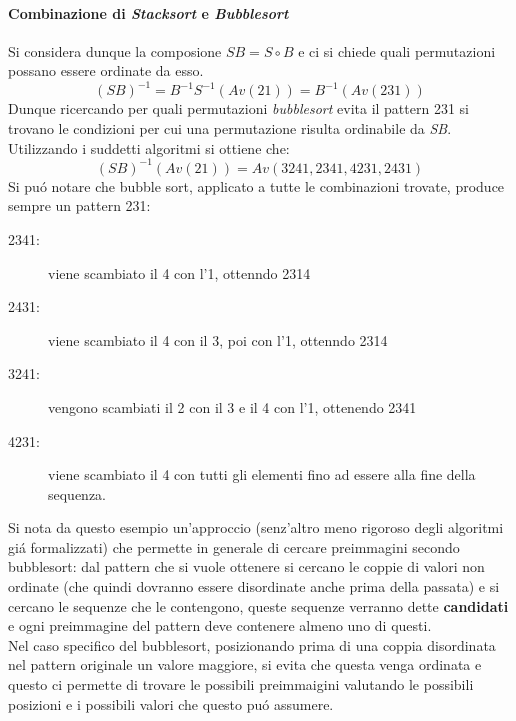 \paragraph*{Combinazione di \textit{Stacksort} e \textit{Bubblesort}} Si considera dunque la composione $SB = S\circ{B}$ e ci si chiede quali permutazioni possano essere ordinate da esso.$$(SB)^{-1}=B^{-1}S^{-1}(Av(21))=B^{-1}(Av(231))$$
Dunque ricercando per quali permutazioni \textit{bubblesort} evita il pattern 231 si trovano le condizioni per cui una permutazione risulta ordinabile da \textit{SB}.\\
Utilizzando i suddetti algoritmi\cite{albert2010inverse} si ottiene che:$$(SB)^{-1}(Av(21))=Av(3241, 2341, 4231, 2431)$$
Si pu\'o notare che bubble sort, applicato a tutte le combinazioni trovate, produce sempre un pattern 231:
\begin{description}
\item[2341:] viene scambiato il 4 con l'1, ottenndo 2314
\item[2431:] viene scambiato il 4 con il 3, poi con l'1, ottenndo 2314
\item[3241:] vengono scambiati il 2 con il 3 e il 4 con l'1, ottenendo 2341
\item[4231:] viene scambiato il 4 con tutti gli elementi fino ad essere alla fine della sequenza.
\end{description}
Si nota da questo esempio un'approccio (senz'altro meno rigoroso degli algoritmi gi\'a formalizzati) che permette in generale di cercare preimmagini secondo bubblesort: dal pattern che si vuole ottenere si cercano le coppie di valori non ordinate (che quindi dovranno essere disordinate anche prima della passata) e si cercano le sequenze che le contengono, queste sequenze verranno dette \textbf{candidati} e ogni preimmagine del pattern deve contenere almeno uno di questi.\\Nel caso specifico del bubblesort, posizionando prima di una coppia disordinata nel pattern originale un valore maggiore, si evita che questa venga ordinata e questo ci permette di trovare le possibili preimmaigini valutando le possibili posizioni e i possibili valori che questo pu\'o assumere.
